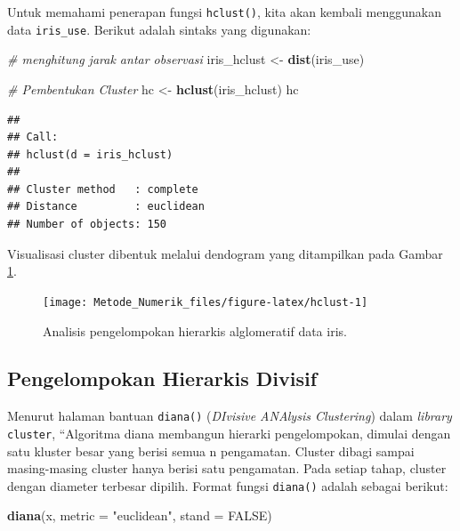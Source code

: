 \documentclass[]{book}
\newenvironment{Shaded}{\begin{snugshade}}{\end{snugshade}}
\newcommand{\CommentTok}[1]{\textcolor[rgb]{0.56,0.35,0.01}{\textit{#1}}}
\newcommand{\DataTypeTok}[1]{\textcolor[rgb]{0.13,0.29,0.53}{#1}}
\newcommand{\KeywordTok}[1]{\textcolor[rgb]{0.13,0.29,0.53}{\textbf{#1}}}
\newcommand{\NormalTok}[1]{#1}
\newcommand{\OtherTok}[1]{\textcolor[rgb]{0.56,0.35,0.01}{#1}}
\newcommand{\StringTok}[1]{\textcolor[rgb]{0.31,0.60,0.02}{#1}}
\theoremstyle{definition}
\theoremstyle{definition}
\theoremstyle{definition}
\theoremstyle{remark}
\begin{document}
Untuk memahami penerapan fungsi \texttt{hclust()}, kita akan kembali menggunakan data \texttt{iris\_use}. Berikut adalah sintaks yang digunakan:

\begin{Shaded}
\begin{Highlighting}[]
\CommentTok{# menghitung jarak antar observasi}
\NormalTok{iris_hclust <-}\StringTok{ }\KeywordTok{dist}\NormalTok{(iris_use)}

\CommentTok{# Pembentukan Cluster}
\NormalTok{hc <-}\StringTok{ }\KeywordTok{hclust}\NormalTok{(iris_hclust)}
\NormalTok{hc}
\end{Highlighting}
\end{Shaded}

\begin{verbatim}
## 
## Call:
## hclust(d = iris_hclust)
## 
## Cluster method   : complete 
## Distance         : euclidean 
## Number of objects: 150
\end{verbatim}

Visualisasi cluster dibentuk melalui dendogram yang ditampilkan pada Gambar \ref{fig:hclust}.

\begin{figure}

{\centering \texttt{[image: Metode\_Numerik\_files/figure-latex/hclust-1]} 

}

\caption{Analisis pengelompokan hierarkis alglomeratif data iris.}\label{fig:hclust}
\end{figure}

\hypertarget{pengelompokan-hierarkis-divisif}{%
\subsection{Pengelompokan Hierarkis Divisif}\label{pengelompokan-hierarkis-divisif}}

Menurut halaman bantuan \texttt{diana()} (\emph{DIvisive ANAlysis Clustering}) dalam \emph{library} \texttt{cluster}, ``Algoritma diana membangun hierarki pengelompokan, dimulai dengan satu kluster besar yang berisi semua n pengamatan. Cluster dibagi sampai masing-masing cluster hanya berisi satu pengamatan. Pada setiap tahap, cluster dengan diameter terbesar dipilih. Format fungsi \texttt{diana()} adalah sebagai berikut:

\begin{Shaded}
\begin{Highlighting}[]
\KeywordTok{diana}\NormalTok{(x, }\DataTypeTok{metric =} \StringTok{"euclidean"}\NormalTok{, }\DataTypeTok{stand =} \OtherTok{FALSE}\NormalTok{)}
\end{Highlighting}
\end{Shaded}
\end{document}
